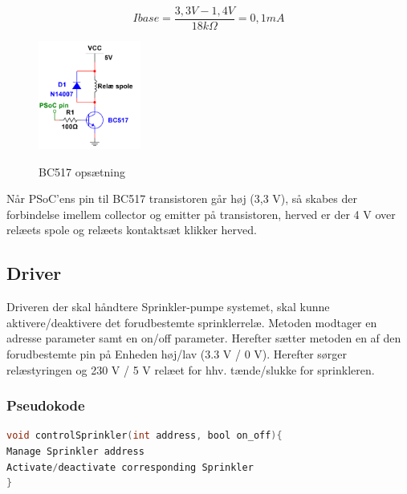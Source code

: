 \begin{equation} 
Ibase = \frac{3,3V - 1,4V}{18k\Omega} = 0,1mA
\label{eq:Ibase}
\end{equation}

\begin{figure}[H] \centering
{\includegraphics[width=0.3\textwidth]{filer/design/Billeder/BC517}}
\caption{BC517 opsætning}
\label{lab:BC517}
\raggedright
\end{figure} 

Når PSoC'ens pin til BC517 transistoren går høj (3,3 V), så skabes der forbindelse imellem collector og emitter på transistoren, herved er der 4 V over relæets spole og relæets kontaktsæt klikker herved. 

\subsection{Driver}

Driveren der skal håndtere Sprinkler-pumpe systemet, skal kunne aktivere/deaktivere det forudbestemte sprinklerrelæ. Metoden modtager en adresse parameter samt en on/off parameter. Herefter sætter metoden en af den forudbestemte pin på Enheden høj/lav (3.3 V / 0 V). Herefter sørger relæstyringen og 230 V / 5 V relæet for hhv. tænde/slukke for sprinkleren. 


\subsubsection*{Pseudokode}

\begin{lstlisting}[language=C]
void controlSprinkler(int address, bool on_off){
Manage Sprinkler address
Activate/deactivate corresponding Sprinkler
}
\end{lstlisting}





 
